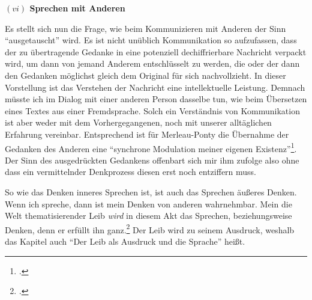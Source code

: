 \documentclass[a4paper, 12pt]{article}
\begin{document}
\begin{onehalfspace}
\noindent\textbf{$(vi)$ Sprechen mit Anderen}

\noindent Es stellt sich nun die Frage, wie beim Kommunizieren mit Anderen der Sinn "`ausgetauscht"' wird. Es ist nicht unüblich Kommunikation so aufzufassen, dass der zu übertragende Gedanke in eine potenziell dechiffrierbare Nachricht verpackt wird, um dann von jemand Anderem entschlüsselt zu werden, die oder der dann den Gedanken möglichst gleich dem Original für sich nachvollzieht. In dieser Vorstellung ist das Verstehen der Nachricht eine intellektuelle Leistung. Demnach müsste ich im Dialog mit einer anderen Person dasselbe tun, wie beim Übersetzen eines Textes aus einer Fremdsprache. Solch ein Verständnis von Kommunikation ist aber weder mit dem Vorhergegangenen, noch mit unserer alltäglichen Erfahrung vereinbar. Entsprechend ist für Merleau-Ponty die Übernahme der Gedanken des Anderen eine "`synchrone Modulation meiner eigenen Existenz"'\footnote{\Cite[Siehe][S. 218]{merleau1966phanomenologie}.}. Der Sinn des ausgedrückten Gedankens offenbart sich mir ihm zufolge also ohne dass ein vermittelnder Denkprozess diesen erst noch entziffern muss.

So wie das Denken inneres Sprechen ist, ist auch das Sprechen äußeres Denken. Wenn ich spreche, dann ist mein Denken von anderen wahrnehmbar. Mein die Welt thematisierender Leib \emph{wird} in diesem Akt das Sprechen, beziehungsweise Denken, denn er erfüllt ihn ganz.\footnote{\Cite[Vgl.][S. 233]{merleau1966phanomenologie}.} Der Leib wird zu seinem Ausdruck, weshalb das Kapitel auch "`Der Leib als Ausdruck und die Sprache"' heißt. %


\end{onehalfspace}
\end{document}

